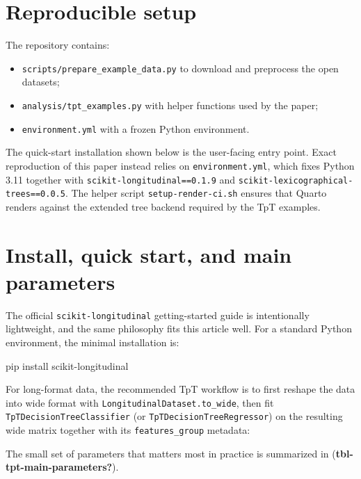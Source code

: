 \documentclass[
]{article}
\newenvironment{Shaded}{}{}
\newcommand{\ExtensionTok}[1]{#1}
\newcommand{\NormalTok}[1]{#1}
\providecommand{\tightlist}{%
  \setlength{\itemsep}{0pt}\setlength{\parskip}{0pt}}
\begin{document}
\section{Reproducible setup}\label{reproducible-setup}

The repository contains:

\begin{itemize}
\tightlist
\item
  \texttt{scripts/prepare\_example\_data.py} to download and preprocess
  the open datasets;
\item
  \texttt{analysis/tpt\_examples.py} with helper functions used by the
  paper;
\item
  \texttt{environment.yml} with a frozen Python environment.
\end{itemize}

The quick-start installation shown below is the user-facing entry point.
Exact reproduction of this paper instead relies on
\texttt{environment.yml}, which fixes Python 3.11 together with
\texttt{scikit-longitudinal==0.1.9} and
\texttt{scikit-lexicographical-trees==0.0.5}. The helper script
\texttt{setup-render-ci.sh} ensures that Quarto renders against the
extended tree backend required by the TpT examples.

\section{Install, quick start, and main
parameters}\label{install-quick-start-and-main-parameters}

The official \texttt{scikit-longitudinal} getting-started guide is
intentionally lightweight, and the same philosophy fits this article
well. For a standard Python environment, the minimal installation is:

\begin{Shaded}
\begin{Highlighting}[]
\ExtensionTok{pip}\NormalTok{ install scikit{-}longitudinal}
\end{Highlighting}
\end{Shaded}

For long-format data, the recommended TpT workflow is to first reshape
the data into wide format with \texttt{LongitudinalDataset.to\_wide},
then fit \texttt{TpTDecisionTreeClassifier} (or
\texttt{TpTDecisionTreeRegressor}) on the resulting wide matrix together
with its \texttt{features\_group} metadata:

The small set of parameters that matters most in practice is summarized
in (\textbf{tbl-tpt-main-parameters?}).
\end{document}
